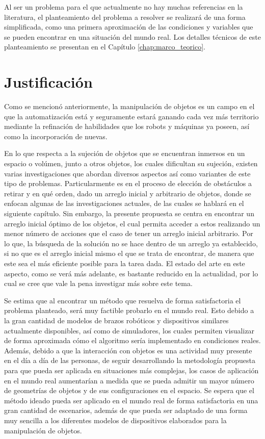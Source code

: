 Al ser un problema para el que actualmente no hay muchas referencias en la literatura, el planteamiento del problema a resolver se realizará de una forma simplificada, como una primera aproximación de las condiciones y variables que se pueden encontrar en una situación del mundo real.
Los detalles técnicos de este planteamiento se presentan en el Capítulo \ref{chap:marco_teorico}.
%
%
\section{Justificación}
%
%
Como se mencionó anteriormente, la manipulación de objetos es un campo en el que la automatización está y seguramente estará ganando cada vez más territorio mediante la refinación de habilidades que los robots y máquinas ya poseen, así como la incorporación de nuevas.

En lo que respecta a la sujeción de objetos que se encuentran inmersos en un espacio o volúmen, junto a otros objetos, los cuales dificultan su sujeción, existen varias investigaciones que abordan diversos aspectos así como variantes de este tipo de problemas.
Particularmente es en el proceso de elección de obstáculos a retirar y en qué orden, dado un arreglo inicial y arbitrario de objetos, donde se enfocan algunas de las investigaciones actuales, de las cuales se hablará en el siguiente capítulo.
Sin embargo, la presente propuesta se centra en encontrar un arreglo inicial óptimo de los objetos, el cual permita acceder a estos realizando un menor número de acciones que el caso de tener un arreglo inicial arbitrario. 
Por lo que, la búsqueda de la solución no se hace dentro de un arreglo ya establecido, si no que es el arreglo inicial mismo el que se trata de encontrar, de manera que este sea el más eficiente posible para la tarea dada.
El estado del arte en este aspecto, como se verá más adelante, es bastante reducido en la actualidad, por lo cual se cree que vale la pena investigar más sobre este tema.

Se estima que al encontrar un método que resuelva de forma satisfactoria el problema planteado, será muy factible probarlo en el mundo real. 
Esto debido a la gran cantidad de modelos de brazos robóticos y dispositivos similares actualmente disponibles, así como de simuladores, los cuales permiten visualizar de forma aproximada cómo el algoritmo sería implementado en condiciones reales. 
Además, debido a que la interacción con objetos es una actividad muy presente en el día a día de las personas, de seguir desarrollando la metodología propuesta para que pueda ser aplicada en situaciones más complejas, los casos de aplicación en el mundo real aumentarían a medida que se pueda admitir un mayor número de geometrías de objetos y de sus configuraciones en el espacio.
Se espera que el método ideado pueda ser aplicado en el mundo real de forma satisfactoria en una gran cantidad de escenarios, además de que pueda ser adaptado de una forma muy sencilla a los diferentes modelos de dispositivos elaborados para la manipulación de objetos.
%
%
